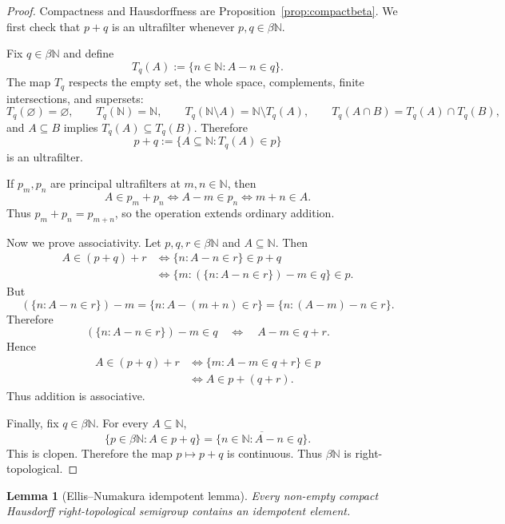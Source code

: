 \documentclass[11pt]{article}
\newtheorem{lemma}[theorem]{Lemma}
\newcommand{\NN}{\mathbb N}
\newcommand{\cl}[1]{\overline{#1}}
\begin{document}
\begin{proof}
Compactness and Hausdorffness are Proposition~\ref{prop:compactbeta}. We first check that $p+q$ is an ultrafilter whenever $p,q\in\beta\NN$.

Fix $q\in\beta\NN$ and define
\[
    T_q(A):=\{n\in\NN:A-n\in q\}.
\]
The map $T_q$ respects the empty set, the whole space, complements, finite intersections, and supersets:
\[
    T_q(\varnothing)=\varnothing,
    \qquad
    T_q(\NN)=\NN,
    \qquad
    T_q(\NN\setminus A)=\NN\setminus T_q(A),
    \qquad
    T_q(A\cap B)=T_q(A)\cap T_q(B),
\]
and $A\subseteq B$ implies $T_q(A)\subseteq T_q(B)$. Therefore
\[
    p+q:=\{A\subseteq\NN:T_q(A)\in p\}
\]
is an ultrafilter.

If $p_m,p_n$ are principal ultrafilters at $m,n\in\NN$, then
\[
    A\in p_m+p_n
    \Longleftrightarrow
    A-m\in p_n
    \Longleftrightarrow
    m+n\in A.
\]
Thus $p_m+p_n=p_{m+n}$, so the operation extends ordinary addition.

Now we prove associativity. Let $p,q,r\in\beta\NN$ and $A\subseteq\NN$. Then
\begin{align*}
A\in (p+q)+r
&\Longleftrightarrow
\{n:A-n\in r\}\in p+q \\
&\Longleftrightarrow
\{m:(\{n:A-n\in r\})-m\in q\}\in p.
\end{align*}
But
\[
(\{n:A-n\in r\})-m
=
\{n:A-(m+n)\in r\}
=
\{n:(A-m)-n\in r\}.
\]
Therefore
\[
(\{n:A-n\in r\})-m\in q
\quad\Longleftrightarrow\quad
A-m\in q+r.
\]
Hence
\begin{align*}
A\in (p+q)+r
&\Longleftrightarrow
\{m:A-m\in q+r\}\in p \\
&\Longleftrightarrow
A\in p+(q+r).
\end{align*}
Thus addition is associative.

Finally, fix $q\in\beta\NN$. For every $A\subseteq\NN$,
\[
    \{p\in\beta\NN:A\in p+q\}
    =
    \cl{\{n\in\NN:A-n\in q\}}.
\]
This is clopen. Therefore the map $p\mapsto p+q$ is continuous. Thus $\beta\NN$ is right-topological.
\end{proof}

\begin{lemma}[Ellis--Numakura idempotent lemma]\label{lem:ellis}
Every non-empty compact Hausdorff right-topological semigroup contains an idempotent element.
\end{lemma}
\end{document}
